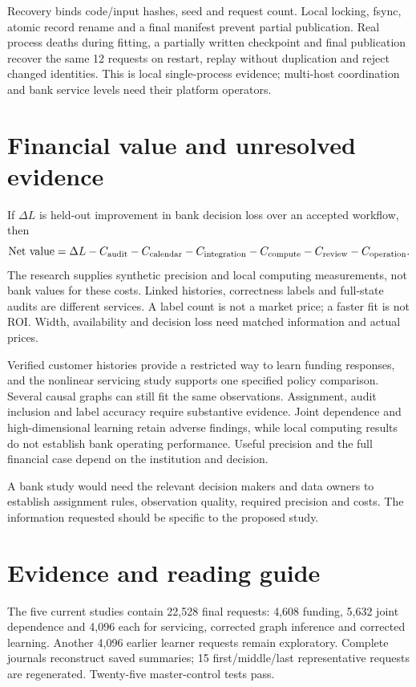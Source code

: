Recovery binds code/input hashes, seed and request count. Local locking, fsync, atomic record rename and a final manifest prevent partial publication. Real process deaths during fitting, a partially written checkpoint and final publication recover the same 12 requests on restart, replay without duplication and reject changed identities. This is local single-process evidence; multi-host coordination and bank service levels need their platform operators.

\section{Financial value and unresolved evidence}
If $\Delta L$ is held-out improvement in bank decision loss over an accepted workflow, then
\[
 \mathrm{Net\ value}=\Delta L-C_{\rm audit}-C_{\rm calendar}-C_{\rm integration}
 -C_{\rm compute}-C_{\rm review}-C_{\rm operation}.
\]
The research supplies synthetic precision and local computing measurements, not bank values for these costs. Linked histories, correctness labels and full-state audits are different services. A label count is not a market price; a faster fit is not ROI. Width, availability and decision loss need matched information and actual prices.

Verified customer histories provide a restricted way to learn funding
responses, and the nonlinear servicing study supports one specified policy
comparison. Several causal graphs can still fit the same observations.
Assignment, audit inclusion and label accuracy require substantive evidence.
Joint dependence and high-dimensional learning retain adverse findings, while
local computing results do not establish bank operating performance. Useful
precision and the full financial case depend on the institution and decision.

A bank study would need the relevant decision makers and data owners
to establish assignment rules, observation quality, required precision and
costs. The information requested should be specific to the proposed study.

\section*{Evidence and reading guide}
The five current studies contain 22,528 final requests: 4,608 funding, 5,632 joint dependence and 4,096 each for servicing, corrected graph inference and corrected learning. Another 4,096 earlier learner requests remain exploratory. Complete journals reconstruct saved summaries; 15 first/middle/last representative requests are regenerated. Twenty-five master-control tests pass.

